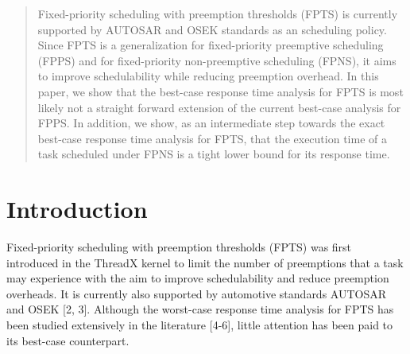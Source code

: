 \documentclass[conference,compsoc]{IEEEtran}
\begin{document}




\maketitle

\begin{abstract}
Fixed-priority scheduling with preemption thresholds (FPTS) is currently supported by AUTOSAR and OSEK standards as an scheduling policy. Since FPTS is a generalization for fixed-priority preemptive scheduling (FPPS) and for fixed-priority non-preemptive scheduling (FPNS), it aims to improve schedulability while reducing preemption overhead. In this paper, we show that the best-case response time analysis for FPTS is most likely not a straight forward extension of the current best-case analysis for FPPS. In addition, we show, as an intermediate step towards the exact best-case response time analysis for FPTS, that the execution time of a task scheduled under FPNS is a tight lower bound for its response time. %
\end{abstract}





%
\IEEEpeerreviewmaketitle



\section{Introduction}
Fixed-priority scheduling with preemption thresholds (FPTS) was first introduced in the ThreadX kernel \cite{TX} to limit the number of preemptions that a task may experience with the aim to improve schedulability and reduce preemption overheads. It is currently also supported by automotive standards AUTOSAR and OSEK [2, 3]. Although the worst-case response time analysis for FPTS has been studied extensively in the literature [4-6], little attention has been paid to its best-case counterpart.
\end{document}
